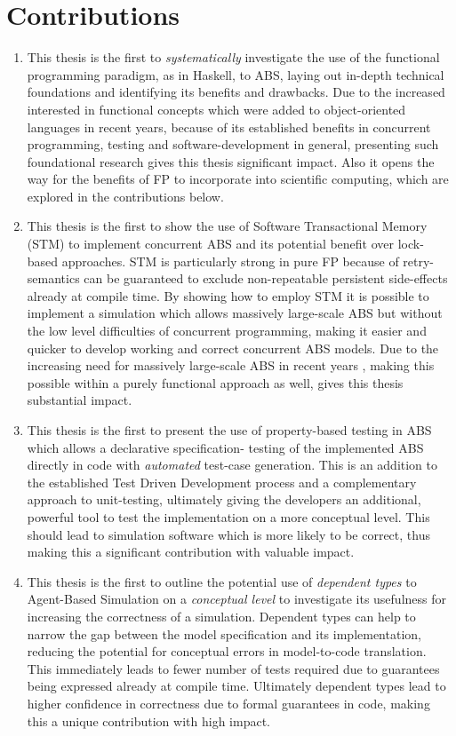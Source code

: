 \newpage

\section{Contributions}
\begin{enumerate}
	\item This thesis is the first to \textit{systematically} investigate the use of the functional programming paradigm, as in Haskell, to ABS, laying out in-depth technical foundations and identifying its benefits and drawbacks. Due to the increased interested in functional concepts which were added to object-oriented languages in recent years, because of its established benefits in concurrent programming, testing and software-development in general, presenting such foundational research gives this thesis significant impact. Also it opens the way for the benefits of FP to incorporate into scientific computing, which are explored in the contributions below.
	
	\item This thesis is the first to show the use of Software Transactional Memory (STM) to implement concurrent ABS and its potential benefit over lock-based approaches. STM is particularly strong in pure FP because of retry-semantics can be guaranteed to exclude non-repeatable persistent side-effects already at compile time. By showing how to employ STM it is possible to implement a simulation which allows massively large-scale ABS but without the low level difficulties of concurrent programming, making it easier and quicker to develop working and correct concurrent ABS models. Due to the increasing need for massively large-scale ABS in recent years \cite{lysenko_framework_2008}, making this possible within a purely functional approach as well, gives this thesis substantial impact.
	
	\item This thesis is the first to present the use of property-based testing in ABS which allows a declarative specification- testing of the implemented ABS directly in code with \textit{automated} test-case generation. This is an addition to the established Test Driven Development process and a complementary approach to unit-testing, ultimately giving the developers an additional, powerful tool to test the implementation on a more conceptual level. This should lead to simulation software which is more likely to be correct, thus making this a significant contribution with valuable impact.

	\item This thesis is the first to outline the potential use of \textit{dependent types} to Agent-Based Simulation on a \textit{conceptual level} to investigate its usefulness for increasing the correctness of a simulation. Dependent types can help to narrow the gap between the model specification and its implementation, reducing the potential for conceptual errors in model-to-code translation. This immediately leads to fewer number of tests required due to guarantees being expressed already at compile time. Ultimately dependent types lead to higher confidence in correctness due to formal guarantees in code, making this a unique contribution with high impact.
\end{enumerate}

